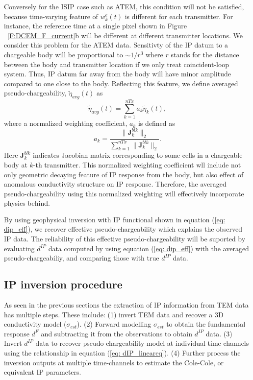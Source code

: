 \documentclass[a4paper, 11pt]{article}
\newcommand{\peta}{\tilde{\eta}}
\newcommand{\dip}{d^{IP}}
\begin{document}
Conversely for the ISIP case such as ATEM, this condition will not be satisfied, because time-varying feature of $w^e_k(t)$ is different for each transmitter. 
For instance, the reference time at a single pixel shown in Figure ~\ref{F:DCEM_F_current}b will be different at different transmitter locations. 
We consider this problem for the ATEM data. 
Sensitivty of the IP datum to a chargeable body will be proportional to $\sim1/r^3$ where $r$ stands for the distance between the body and transmitter location if we only treat coincident-loop system. 
Thus, IP datum far away from the body will have minor amplitude compared to one close to the body. 
Reflecting this feature, we define averaged pseudo-chargeability, $\peta_{avg}(t)$ as 
\begin{equation}
  \peta_{avg}(t) = \sum_{k=1}^{nTx} a_k \peta_k(t),
  \label{eq: pseudo-chargeability_avg}
\end{equation}
where a normalized weighting coefficient, $a_k$ is defined as 
\begin{equation}
  a_k = \frac{\| \mathbf{J}^{blk}_k \|_2  }{\sum_{k=1}^{nTx} \| \mathbf{J}^{blk}_k \|_2 }.
\end{equation}
Here $\mathbf{J}^{blk}_k$ indicates Jacobian matrix corresponding to some cells in a chargeable body at $k$-th transmitter. 
This normalized weighting coefficient wll include not only geometric decaying feature of IP response from the body, but also effect of anomalous conductivity structure on IP response. 
Therefore, the averaged pseudo-chargeability using this normalized weighting will effectively incorporate physics behind. 

By using geophysical inversion with IP functional shown in equation (\ref{eq: dip_eff}), we recover effective pseudo-chargeability which explains the observed IP data. 
The reliability of this effective pseudo-chargeability will be suported by evaluating $\dip$ data computed by using equation (\ref{eq: dip_eff}) with the averaged pseudo-chargeabiliy, and comparing those with true $\dip$ data. 


\subsection{IP inversion procedure}
As seen in the previous sections the extraction of IP information from TEM data has multiple steps. These include: (1) invert TEM data and recover a 3D conductivity model ($\sigma_{est}$). 
(2) Forward modelling $\sigma_{est}$ to obtain the fundamental response $d^F$ and subtracting it from the observations to obtain $\dip$ data.
(3) Invert  $\dip$ data to recover pseudo-chargeability model at individual time channels using the relationship in equation (\ref{eq: dIP_lineareq}). 
(4) Further process the inversion outputs at multiple time-channels  to estimate the Cole-Cole, or equivalent IP parameters.
\end{document}
